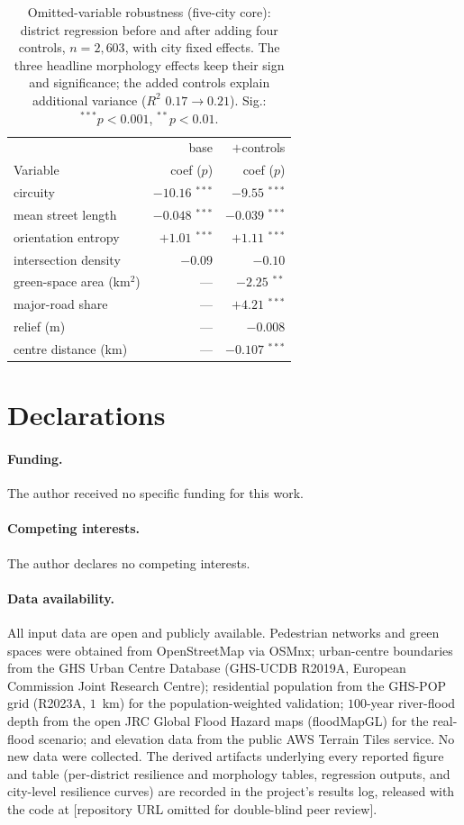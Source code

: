 \documentclass[sn-mathphys-num,pdflatex]{sn-jnl}
\begin{document}
\begin{table}[t]\centering
\caption{Omitted-variable robustness (five-city core): district regression before and
after adding four controls, $n=2{,}603$, with city fixed effects. The three headline
morphology effects keep their sign and significance; the added controls explain
additional variance ($R^2$ $0.17\to0.21$). Sig.: $^{***}p<0.001$, $^{**}p<0.01$.}
\label{tab:controls}
\begin{tabular}{lrr}
\toprule
& base & $+$controls\\
Variable & coef ($p$) & coef ($p$)\\
\midrule
circuity & $-10.16$ $^{***}$ & $-9.55$ $^{***}$\\
mean street length & $-0.048$ $^{***}$ & $-0.039$ $^{***}$\\
orientation entropy & $+1.01$ $^{***}$ & $+1.11$ $^{***}$\\
intersection density & $-0.09$ & $-0.10$\\
\midrule
green-space area (km$^2$) & --- & $-2.25$ $^{**}$\\
major-road share & --- & $+4.21$ $^{***}$\\
relief (m) & --- & $-0.008$\\
centre distance (km) & --- & $-0.107$ $^{***}$\\
\bottomrule
\end{tabular}
\end{table}


\section*{Declarations}

\paragraph{Funding.} The author received no specific funding for this work.

\paragraph{Competing interests.} The author declares no competing interests.

\paragraph{Data availability.} All input data are open and publicly available.
Pedestrian networks and green spaces were obtained from OpenStreetMap via
OSMnx; urban-centre boundaries from the GHS Urban Centre Database (GHS-UCDB
R2019A, European Commission Joint Research Centre); residential population from the
GHS-POP grid (R2023A, $1$~km) for the population-weighted validation; $100$-year
river-flood depth from the open JRC Global Flood Hazard maps (floodMapGL) for the
real-flood scenario; and elevation data from the public AWS Terrain Tiles service. No new data were collected. The derived
artifacts underlying every reported figure and table (per-district resilience and
morphology tables, regression outputs, and city-level resilience curves) are
recorded in the project's results log, released with the code at
[repository URL omitted for double-blind peer review].
\end{document}
